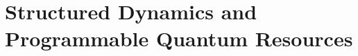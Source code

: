 \documentclass[twocolumn,10pt]{article}
\begin{document}




\section*{Structured Dynamics and Programmable Quantum Resources}

\end{document}
